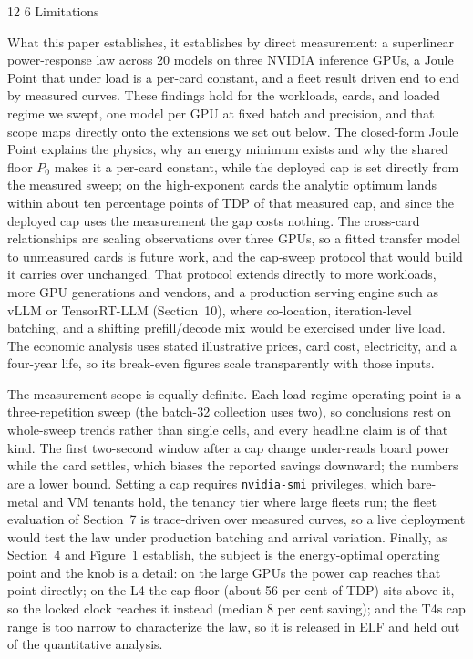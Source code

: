 \documentclass[3p,twocolumn]{elsarticle}
\makeatletter
\renewcommand\section{\@startsection{section}{1}{\z@}%
           {12\p@ \@plus 4\p@ \@minus 4\p@}%
           {6\p@ \@plus 4\p@ \@minus 3\p@}%
           {\normalsize\bfseries\boldmath}}
\makeatother
\begin{document}
\section{Limitations}\label{limitations}

What this paper establishes, it establishes by direct measurement: a superlinear power-response law across 20 models on three NVIDIA inference GPUs, a Joule Point that under load is a per-card constant, and a fleet result driven end to end by measured curves. These findings hold for the workloads, cards, and loaded regime we swept, one model per GPU at fixed batch and precision, and that scope maps directly onto the extensions we set out below. The closed-form Joule Point explains the physics, why an energy minimum exists and why the shared floor {\(P_0\)} makes it a per-card constant, while the deployed cap is set directly from the measured sweep; on the high-exponent cards the analytic optimum lands within about ten percentage points of TDP of that measured cap, and since the deployed cap uses the measurement the gap costs nothing. The cross-card relationships are scaling observations over three GPUs, so a fitted transfer model to unmeasured cards is future work, and the cap-sweep protocol that would build it carries over unchanged. That protocol extends directly to more workloads, more GPU generations and vendors, and a production serving engine such as vLLM or TensorRT-LLM (Section~10), where co-location, iteration-level batching, and a shifting prefill/decode mix would be exercised under live load. The economic analysis uses stated illustrative prices, card cost, electricity, and a four-year life, so its break-even figures scale transparently with those inputs.

The measurement scope is equally definite. Each load-regime operating point is a three-repetition sweep (the batch-32 collection uses two), so conclusions rest on whole-sweep trends rather than single cells, and every headline claim is of that kind. The first two-second window after a cap change under-reads board power while the card settles, which biases the reported savings downward; the numbers are a lower bound. Setting a cap requires \texttt{nvidia-smi} privileges, which bare-metal and VM tenants hold, the tenancy tier where large fleets run; the fleet evaluation of Section~7 is trace-driven over measured curves, so a live deployment would test the law under production batching and arrival variation. Finally, as Section~4 and Figure~1 establish, the subject is the energy-optimal operating point and the knob is a detail: on the large GPUs the power cap reaches that point directly; on the L4 the cap floor (about 56 per cent of TDP) sits above it, so the locked clock reaches it instead (median 8 per cent saving); and the T4\textquotesingle s cap range is too narrow to characterize the law, so it is released in ELF and held out of the quantitative analysis.
\end{document}
